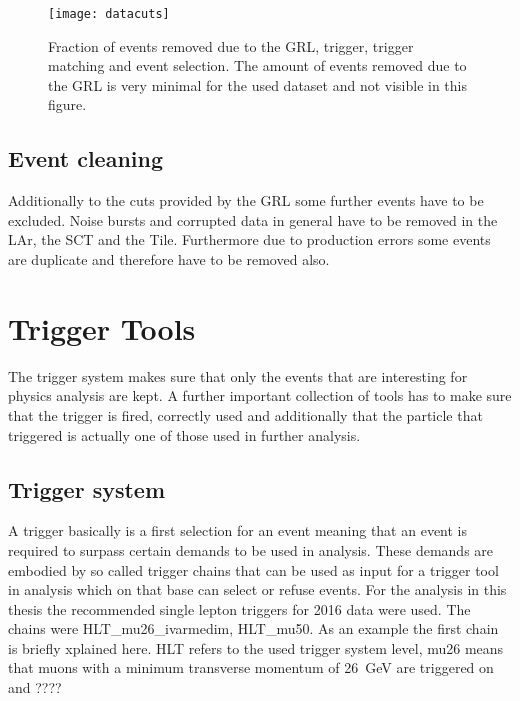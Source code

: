 \begin{figure}[h]
\centering
\texttt{[image: datacuts]}
\caption[Fraction of events removed due to the GRL, trigger, trigger matching and event selection]{Fraction of events removed due to the GRL, trigger, trigger matching and event selection. The amount of events removed due to the GRL is very minimal for the used dataset and not visible in this figure.}
\label{fig:datacuts}
\end{figure}



\subsection{Event cleaning}

Additionally to the cuts provided by the GRL some further events have to be excluded. Noise bursts and corrupted data in general have to be removed in the LAr, the SCT and the Tile. Furthermore due to production errors some events are duplicate and therefore have to be removed also. 


\section{Trigger Tools}

The trigger system makes sure that only the events that are interesting for physics analysis are kept.
A further important collection of tools has to make sure that the trigger is fired, correctly used and additionally that the particle that triggered is actually one of those used in further analysis.


\subsection{Trigger system}


A trigger basically is a first selection for an event meaning that an event is required to surpass certain demands to be used in analysis. These demands are embodied by so called trigger chains that can be used as input for a trigger tool in analysis which on that base can select or refuse events. For the analysis in this thesis the recommended single lepton triggers for 2016 data were used. The chains were HLT\_mu26\_ivarmedim, HLT\_mu50. As an example the first chain is briefly xplained here. HLT refers to the used trigger system level, mu26 means that muons with a minimum transverse momentum of \SI{26}{\GeV} are triggered on and  ????







